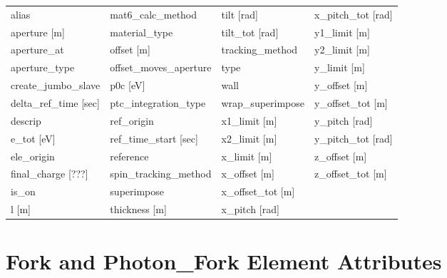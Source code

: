  \begin{tabular}{llll} \toprule
alias                            & mat6_calc_method                 & tilt [rad]                       & x_pitch_tot [rad]                \\
aperture [m]                     & material_type                    & tilt_tot [rad]                   & y1_limit [m]                     \\
aperture_at                      & offset [m]                       & tracking_method                  & y2_limit [m]                     \\
aperture_type                    & offset_moves_aperture            & type                             & y_limit [m]                      \\
create_jumbo_slave               & p0c [eV]                         & wall                             & y_offset [m]                     \\
delta_ref_time [sec]             & ptc_integration_type             & wrap_superimpose                 & y_offset_tot [m]                 \\
descrip                          & ref_origin                       & x1_limit [m]                     & y_pitch [rad]                    \\
e_tot [eV]                       & ref_time_start [sec]             & x2_limit [m]                     & y_pitch_tot [rad]                \\
ele_origin                       & reference                        & x_limit [m]                      & z_offset [m]                     \\
final_charge [???]               & spin_tracking_method             & x_offset [m]                     & z_offset_tot [m]                 \\
is_on                            & superimpose                      & x_offset_tot [m]                 &                                  \\
l [m]                            & thickness [m]                    & x_pitch [rad]                    &                                  \\
 \bottomrule
 \end{tabular}
 \vfill
 
 \section{Fork and Photon_Fork Element Attributes}
 \label{s:list.fork}
 
